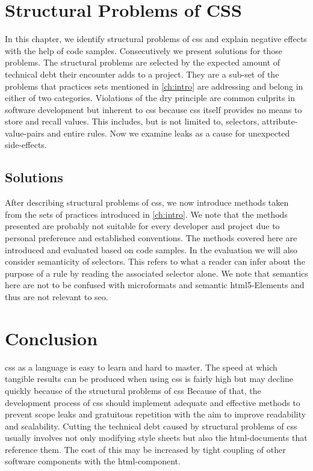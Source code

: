 

\chapter{Structural Problems of CSS}
In this chapter, we identify structural problems of \gls{css} and explain negative effects with the help of code samples.
Consecutively we present solutions for those problems.
The structural problems are selected by the expected amount of technical debt their encounter adds to a project.
They are a sub-set of the problems that practices sets mentioned in \autoref{ch:intro} are addressing and belong in either of two categories.
Violations of the \gls{dry} principle are common culprits in software development but inherent to \gls{css} because \gls{css} itself provides no means to store and recall values.
This includes, but is not limited to, selectors, attribute-value-pairs and entire rules.
Now we examine leaks as a cause for unexpected side-effects.




\section{Solutions}
After describing structural problems of \gls{css}, we now introduce methods taken from the sets of practices introduced in \autoref{ch:intro}.
We note that the methods presented are probably not suitable for every developer and project due to personal preference and established conventions.
The methods covered here are introduced and evaluated based on code samples.
In the evaluation we will also consider semanticity of selectors.
This refers to what a reader can infer about the purpose of a rule by reading the associated selector alone.
We note that semantics here are not to be confused with microformats and semantic \gls{html}5-Elements and thus are not relevant to \gls{seo}.





\chapter{Conclusion}
\gls{css} as a language is easy to learn and hard to master.
The speed at which tangible results can be produced when using \gls{css} is fairly high but may decline quickly because of the structural problems of \gls{css}
Because of that, the development process of \gls{css} should implement adequate and effective methods to prevent scope leaks and gratuitous repetition with the aim to improve readability and scalability.
Cutting the technical debt caused by structural problems of \gls{css} usually involves not only modifying style sheets but also the \gls{html}-documents that reference them.
The cost of this may be increased by tight coupling of other software components with the \gls{html}-component.

